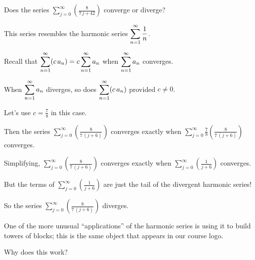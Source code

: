 \documentclass{ximera}
\begin{document}
\begin{question}
  Does the series \(\displaystyle\sum_{j=0}^\infty \left( \displaystyle\frac{8}{7 \, j + 42} \right)\) converge or diverge?
  
  \begin{solution}
    \begin{hint}
      This series resembles the harmonic series \(\displaystyle\displaystyle\sum_{n=1}^\infty \displaystyle\displaystyle\frac{1}{n}\).
    \end{hint}
    \begin{hint}
      Recall that \(\displaystyle\displaystyle\sum_{n=1}^\infty (c \, a_n) = c \displaystyle\displaystyle\sum_{n=1}^\infty a_n\) when \(\displaystyle\displaystyle\sum_{n=1}^\infty a_n\) converges.
    \end{hint}
    \begin{hint}
      When \(\displaystyle\displaystyle\sum_{n=1}^\infty a_n\) diverges, so does \(\displaystyle\displaystyle\sum_{n=1}^\infty (c \, a_n)\) provided \(c \neq 0\).
    \end{hint}
    \begin{hint}
      Let's use \(c = \displaystyle\frac{7}{8}\) in this case.
    \end{hint}
    \begin{hint}
      Then the series \(\displaystyle\sum_{j=0}^\infty \left( \displaystyle\frac{8}{7 \, {\left(j + 6\right)}} \right)\) converges exactly when \(\displaystyle\sum_{j=0}^\infty \displaystyle\frac{7}{8} \left( \displaystyle\frac{8}{7 \, {\left(j + 6\right)}} \right)\) converges.
    \end{hint}
    \begin{hint}
      Simplifying, \(\displaystyle\sum_{j=0}^\infty \left( \displaystyle\frac{8}{7 \, {\left(j + 6\right)}} \right)\) converges exactly when \(\displaystyle\sum_{j=0}^\infty \left( \displaystyle\frac{1}{j + 6} \right)\) converges.
    \end{hint}
    \begin{hint}
      But the terms of \(\displaystyle\sum_{j=0}^\infty \left( \displaystyle\frac{1}{j + 6} \right)\) are just the tail of the divergent harmonic series!
    \end{hint}
    \begin{hint}
      So the series \(\displaystyle\sum_{j=0}^\infty \left( \displaystyle\frac{8}{7 \, {\left(j + 6\right)}} \right)\) diverges.
      
    \end{hint}
    
    \begin{multiple-choice}
    \end{multiple-choice}
    
  \end{solution}
\end{question}

One of the more unusual ``applications'' of the harmonic series is using it to build towers of blocks; this is the same object that appears in our course logo.  


Why does this work?

\end{document}

